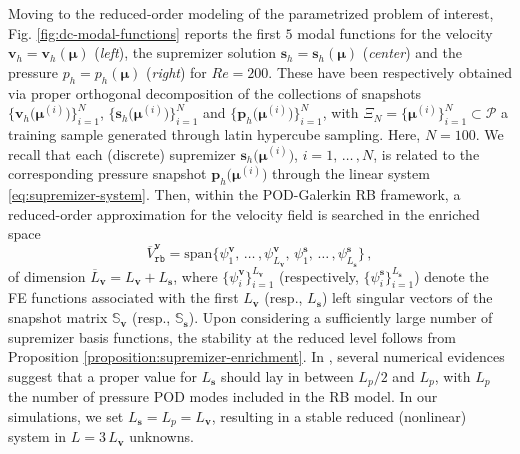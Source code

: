 \documentclass[12pt, a4paper, twoside, openright, notitlepage]{report}
\numberwithin{equation}{chapter}
\theoremstyle{theorem}
\theoremstyle{definition}
\theoremstyle{remark}
\theoremstyle{proposition}
\numberwithin{figure}{chapter}
\newcommand{\bg}[1]{\boldsymbol{#1}}
\begin{document}
		Moving to the reduced-order modeling of the parametrized problem of interest, Fig. \ref{fig:dc-modal-functions} reports the first $5$ modal functions for the velocity $\bg{v}_h = \bg{v}_h(\bg{\mu})$ (\emph{left}), the supremizer solution $\bg{s}_h = \bg{s}_h(\bg{\mu})$ (\emph{center}) and the pressure $p_h = p_h(\bg{\mu})$ (\emph{right}) for $Re = 200$. These have been respectively obtained via proper orthogonal decomposition of the collections of snapshots $\big\lbrace \mathbf{v}_h \big( \bg{\mu}^{(i)} \big) \big\rbrace_{i = 1}^N$, $\big\lbrace \mathbf{s}_h \big( \bg{\mu}^{(i)} \big) \big\rbrace_{i = 1}^N$ and $\big\lbrace \mathbf{p}_h \big( \bg{\mu}^{(i)} \big) \big\rbrace_{i = 1}^N$, with $\Xi_N = \big\lbrace \bg{\mu}^{(i)} \big\rbrace_{i = 1}^N \subset \mathcal{P}$ a training sample generated through latin hypercube sampling. Here, $N = 100$. We recall that each (discrete) supremizer $\mathbf{s}_h \big( \bg{\mu}^{(i)} \big)$, $i = 1, \, \ldots \, , N$, is related to the corresponding pressure snapshot $\mathbf{p}_h \big( \bg{\mu}^{(i)} \big)$ through the linear system \eqref{eq:supremizer-system}. Then, within the POD-Galerkin RB framework, a reduced-order approximation for the velocity field is searched in the enriched space 
		\begin{equation*}
			\overline{V}_{\texttt{rb}}^{\bg{v}} = \text{span} \big\lbrace \psi_1^{\bg{v}}, \, \ldots \, , \psi_{L_{\bg{v}}}^{\bg{v}}, \, \psi_1^{\bg{s}}, \, \ldots \, , \psi_{L_{\bg{s}}}^{\bg{s}} \big\rbrace \, ,
		\end{equation*}
		of dimension $\overline{L}_{\bg{v}} = L_{\bg{v}} + L_{\bg{s}}$, where $\big\lbrace \psi_i^{\bg{v}} \big\rbrace_{i = 1}^{L_{\bg{v}}}$ (respectively, $\big\lbrace \psi_i^{\bg{s}} \big\rbrace_{i = 1}^{L_{\bg{s}}}$) denote the FE functions associated with the first $L_{\bg{v}}$ (resp., $L_{\bg{s}}$) left singular vectors of the snapshot matrix $\mathbb{S}_{\bg{v}}$ (resp., $\mathbb{S}_{\bg{s}}$). Upon considering a sufficiently large number of supremizer basis functions, the stability at the reduced level follows from Proposition \ref{proposition:supremizer-enrichment}. In \cite{Bal14}, several numerical evidences suggest that a proper value for $L_{\bg{s}}$ should lay in between $L_p / 2$ and $L_p$, with $L_p$ the number of pressure POD modes included in the RB model. In our simulations, we set $L_{\bg{s}} = L_p = L_{\bg{v}}$, resulting in a stable reduced (nonlinear) system in $L = 3 \, L_{\bg{v}}$ unknowns.
		
\end{document}

